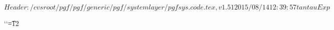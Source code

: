 %
%
%

\ProvidesPackageRCS[v\pgfversion] $Header: /cvsroot/pgf/pgf/generic/pgf/systemlayer/pgfsys.code.tex,v 1.51 2015/08/14 12:39:57 tantau Exp $




\def\pgfset{\pgfqkeys{/pgf}}

\newif\ifpgfpicture


%
% 
{\catcode`\catcode`\t=12\gdef\Pgf@geT#1pt{#1}}

\def\pgf@sys@tonumber#1{\expandafter\Pgf@geT\the#1}

\def\pgf@sys@bp@correct#1{#1=0.99627#1}

\def\pgf@sys@bp#1{%
  {%
    \pgf@x=#1\relax%
    \pgf@x=0.99627\pgf@x%
    \edef\temp{\expandafter\Pgf@geT\the\pgf@x\space}%
    \pgfutil@toks@\expandafter\expandafter\expandafter{\expandafter\pgfsysprotocol@currentprotocol\temp}%
    \xdef\pgfsysprotocol@currentprotocol{\the\pgfutil@toks@}%
  }%
}
\def\pgf@sys@pt#1{%
  {%
    \pgf@x=#1\relax%
    \edef\temp{\expandafter\Pgf@geT\the\pgf@x\space}%
    \pgfutil@toks@\expandafter\expandafter\expandafter{\expandafter\pgfsysprotocol@currentprotocol\temp}%
    \xdef\pgfsysprotocol@currentprotocol{\the\pgfutil@toks@}%
  }%
}


\newdimen\pgf@x
\newdimen\pgf@y
\newdimen\pgf@xa
\newdimen\pgf@ya
\newdimen\pgf@xb
\newdimen\pgf@yb
\newdimen\pgf@xc
\newdimen\pgf@yc

\newwrite\w@pgf@writea
\newread\r@pgf@reada
\let\pgfutil@inputcheck=\r@pgf@reada

\newcount\c@pgf@counta
\newcount\c@pgf@countb
\newcount\c@pgf@countc
\newcount\c@pgf@countd

\newtoks\t@pgf@toka
\newtoks\t@pgf@tokb
\newtoks\t@pgf@tokc

\let\pgfmath@x\pgf@x
\let\pgfmath@xa\pgf@xa
\let\pgfmath@xb\pgf@xb
\let\pgfmath@xc\pgf@xc

